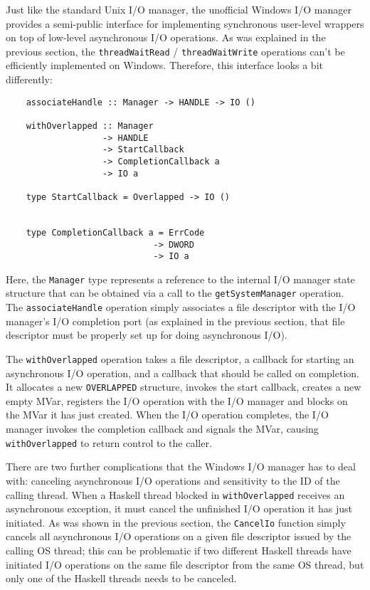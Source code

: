\documentclass[a4paper,11pt,oneside]{report}
\begin{document}
Just like the standard Unix I/O manager, the unofficial Windows I/O manager
provides a semi-public interface for implementing synchronous user-level
wrappers on top of low-level asynchronous I/O operations. As was explained in
the previous section, the \texttt{threadWaitRead} / \texttt{threadWaitWrite}
operations can't be efficiently implemented on Windows. Therefore, this
interface looks a bit differently:

\begin{verbatim}
    associateHandle :: Manager -> HANDLE -> IO ()

    withOverlapped :: Manager
                   -> HANDLE
                   -> StartCallback
                   -> CompletionCallback a
                   -> IO a

    type StartCallback = Overlapped -> IO ()


    type CompletionCallback a = ErrCode
                             -> DWORD
                             -> IO a

\end{verbatim}

Here, the \texttt{Manager} type represents a reference to the internal I/O
manager state structure that can be obtained via a call to the
\texttt{getSystemManager} operation. The \texttt{associateHandle} operation
simply associates a file descriptor with the I/O manager's I/O completion port
(as explained in the previous section, that file descriptor must be properly set
up for doing asynchronous I/O).

The \texttt{withOverlapped} operation takes a file descriptor, a callback for
starting an asynchronous I/O operation, and a callback that should be called on
completion. It allocates a new \texttt{OVERLAPPED} structure, invokes the start
callback, creates a new empty MVar, registers the I/O operation with the I/O
manager and blocks on the MVar it has just created. When the I/O operation
completes, the I/O manager invokes the completion callback and signals the MVar,
causing \texttt{withOverlapped} to return control to the caller.

There are two further complications that the Windows I/O manager has to deal
with: canceling asynchronous I/O operations and sensitivity to the ID of the
calling thread. When a Haskell thread blocked in \texttt{withOverlapped}
receives an asynchronous exception, it must cancel the unfinished I/O operation
it has just initiated. As was shown in the previous section, the
\texttt{CancelIo} function simply cancels all asynchronous I/O operations on a
given file descriptor issued by the calling OS thread; this can be problematic
if two different Haskell threads have initiated I/O operations on the same file
descriptor from the same OS thread, but only one of the Haskell threads needs to
be canceled.
\end{document}
